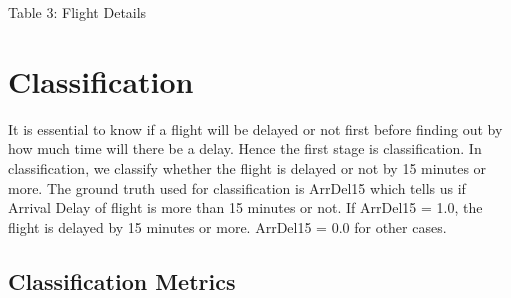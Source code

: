 \documentclass[12pt,letter-paper]{article}
\begin{document}
        \begin{center}
            Table 3: Flight Details
        \end{center}
        
\section{Classification}
    
    It is essential to know if a flight will be delayed or not first before finding out by how much time will there be a delay. Hence the first stage is classification. In classification, we classify whether the flight is delayed or not by 15 minutes or more. The ground truth used for classification is ArrDel15 which tells us if Arrival Delay of flight is more than 15 minutes or not. If ArrDel15 = 1.0, the flight is delayed by 15 minutes or more. ArrDel15 = 0.0 for other cases.

     \subsection{Classification Metrics}
    
\end{document}
